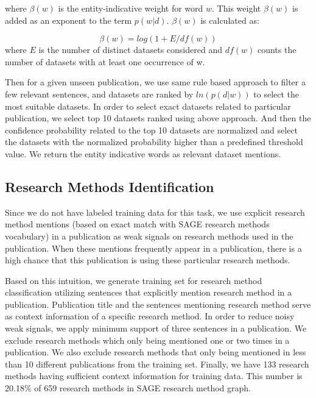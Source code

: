 where $\beta(w)$ is the entity-indicative weight for word $w$. This weight $\beta(w)$ is added as an exponent to the term $p(w|d)$. $\beta(w)$ is calculated as:

\begin{equation}
\beta(w) = log(1 + E / df(w))
\end{equation}
where $E$ is the number of distinct datasets considered and $df(w)$ counts the number of datasets with at least one occurrence of w.

Then for a given unseen publication, we use same rule based approach \cite{Ghavimi2016IdentifyingAI} to filter a few relevant sentences, and datasets are ranked by $ln(p(d|w))$ to select the most suitable datasets. In order to select exact datasets related to particular publication, we select top 10 datasets ranked using above approach. And then the confidence probability related to the top 10 datasets are normalized and select the datasets with the normalized probability higher than a predefined threshold value. We return the entity indicative words as relevant dataset mentions.

\subsection{Research Methods Identification}
\label{ssec:research_method_identification}

Since we do not have labeled training data for this task, we use explicit research method mentions (based on exact match with SAGE research methods vocabulary) in a publication as weak signals on research methods used in the publication. When these mentions frequently appear in a publication, there is a high chance that this publication is using these particular research methods.

Based on this intuition, we generate training set for research method classification utilizing sentences that explicitly mention research method in a publication. Publication title and the sentences mentioning research method serve as context information of a specific research method. In order to reduce noisy weak signals, we apply minimum support of three sentences in a publication. We exclude research methods which only being mentioned one or two times in a publication. We also exclude research methods that only being mentioned in less than 10 different publications from the training set. Finally, we have 133 research methods having sufficient context information for training data. This number is 20.18\% of 659 research methods in SAGE research method graph.

